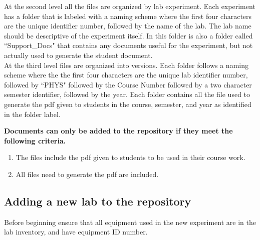 \documentclass[justified]{book}
\begin{document}
\noindent At the second level all the files are organized by lab experiment. Each experiment has a folder that is labeled with a naming scheme where the first four characters are the unique identifier number, followed by the name of the lab. The lab name should be descriptive of the experiment itself. In this folder is also a folder called ``Support\_Docs" that contains any documents useful for the experiment, but not actually used to generate the student document. \\

\noindent At the third level files are organized into versions. Each folder follows a naming scheme where the the first four characters are the unique lab identifier number, followed by ``PHYS" followed by the Course Number followed by a two character semester identifier, followed by the year. Each folder contains all the file used to generate the pdf given to students in the course, semester, and year as identified in the folder label. \\


\vspace{12pt}
{\bf Documents can only be added to the repository if they meet the following criteria.}
\begin{enumerate}
\item The files include the pdf given to students to be used in their course work.
\item All files need to generate the pdf are included.
\end{enumerate}



\subsection{Adding a new lab to the repository}

Before beginning ensure that all equipment used in the new experiment are in the lab inventory, and have equipment ID number. 
\end{document}
